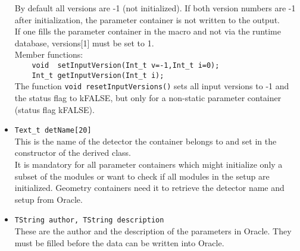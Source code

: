\begin{itemize}
   By default all versions are -1 (not initialized). If both version numbers are -1 after initialization, the parameter 
   container is not written to the output.\\
   If one fills the parameter container in the macro and not via the runtime database, versions[1] must be set to 1.\\ 
   Member functions:\\ 
   \verb+    void  setInputVersion(Int_t v=-1,Int_t i=0);+\\
   \verb+    Int_t getInputVersion(Int_t i);+\\
   The function \verb+void resetInputVersions()+ sets all input versions to -1 and the status flag to kFALSE, but only for 
   a non-static parameter container (status flag kFALSE). 
 \item \verb+Text_t detName[20]+\\
   This is the name of the detector the container belongs to and set in the constructor of the derived class.\\
   It is mandatory for all parameter containers which might initialize only a subset of the modules or want to check if all 
   modules in the setup are initialized. Geometry containers need it to retrieve the detector name and setup from Oracle.
 \item \verb+TString author, TString description+\\
   These are the author and the description of the parameters in Oracle. They must be filled before the data can be written into 
   Oracle.
\end{itemize}

